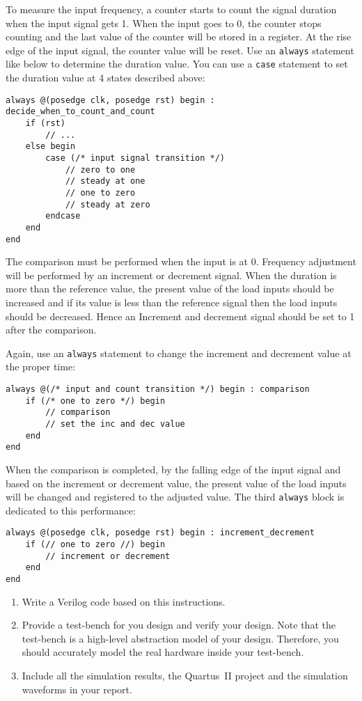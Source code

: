 \documentclass[12pt, logo=tehranDLDL/ut]{tehranDLDL}
\begin{document}
To measure the input frequency, a counter starts to count the signal duration when the input signal gets 1. When the input goes to 0, the counter stops counting and the last value of the counter will be stored in a register. At the rise edge of the input signal, the counter value will be reset.
Use an \lstinline{always} statement like below to determine the duration value. You can use a \lstinline{case} statement to set the duration value at 4 states described above:
\begin{lstlisting}
always @(posedge clk, posedge rst) begin : decide_when_to_count_and_count
    if (rst)
        // ...
    else begin
        case (/* input signal transition */)
            // zero to one
            // steady at one
            // one to zero
            // steady at zero
        endcase
    end
end
\end{lstlisting}

The comparison must be performed when the input is at 0. Frequency adjustment will be performed by an increment or decrement signal. When the duration is more than the reference value, the present value of the load inputs should be increased and if its value is less than the reference signal then the load inputs should be decreased. Hence an Increment and decrement signal should be set to 1 after the comparison.

Again, use an \lstinline{always} statement to change the increment and decrement value at the proper time:
\begin{lstlisting}
always @(/* input and count transition */) begin : comparison
    if (/* one to zero */) begin
        // comparison
        // set the inc and dec value
    end
end
\end{lstlisting}

When the comparison is completed, by the falling edge of the input signal and based on the increment or decrement value, the present value of the load inputs will be changed and registered to the adjusted value. The third \lstinline{always} block is dedicated to this performance:
\begin{lstlisting}
always @(posedge clk, posedge rst) begin : increment_decrement
    if (// one to zero //) begin
        // increment or decrement
    end
end
\end{lstlisting}

\begin{enumerate}
    \item Write a Verilog code based on this instructions.
    \item Provide a test-bench for you design and verify your design. Note that the test-bench is a high-level abstraction model of your design. Therefore, you should accurately model the real hardware inside your test-bench.
    \item Include all the simulation results, the Quartus~II project and the simulation waveforms in your report.
\end{enumerate}
\end{document}
